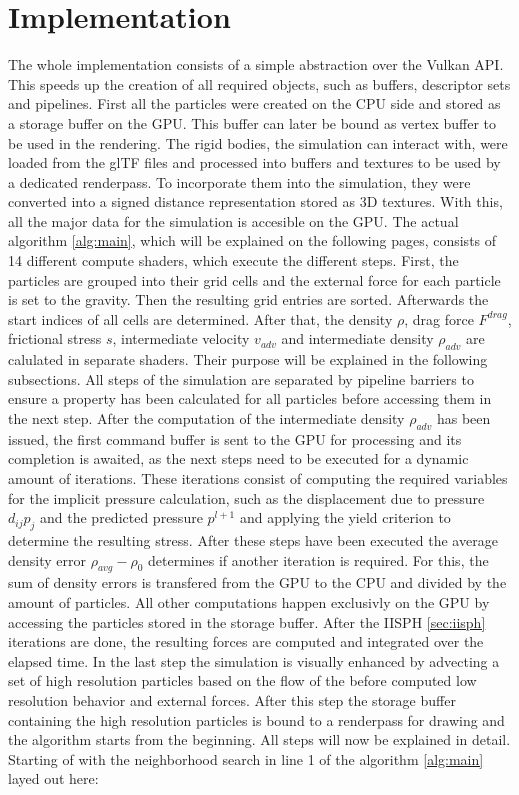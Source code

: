 \documentclass[intern]{cgMA}
\begin{document}
    \section{Implementation}\label{sec:impl}
    The whole implementation consists of a simple abstraction over the Vulkan API. This speeds up the creation of all required objects, such as buffers, descriptor sets and pipelines. First all the particles were created on the CPU side and stored as a storage buffer on the GPU. This buffer can later be bound as vertex buffer to be used in the rendering. The rigid bodies, the simulation can interact with, were loaded from the glTF files and processed into buffers and textures to be used by a dedicated renderpass. To incorporate them into the simulation, they were converted into a signed distance representation stored as 3D textures. With this, all the major data for the simulation is accesible on the GPU.
    The actual algorithm \ref*{alg:main}, which will be explained on the following pages, consists of 14 different compute shaders, which execute the different steps. First, the particles are grouped into their grid cells and the external force for each particle is set to the gravity. Then the resulting grid entries are sorted. Afterwards the start indices of all cells are determined. After that, the density $\rho$, drag force $F^{drag}$, frictional stress $s$, intermediate velocity $v_{adv}$ and intermediate density $\rho_{adv}$ are calulated in separate shaders. Their purpose will be explained in the following subsections. All steps of the simulation are separated by pipeline barriers to ensure a property has been calculated for all particles before accessing them in the next step. After the computation of the intermediate density $\rho_{adv}$ has been issued, the first command buffer is sent to the GPU for processing and its completion is awaited, as the next steps need to be executed for a dynamic amount of iterations. These iterations consist of computing the required variables for the implicit pressure calculation, such as the displacement due to pressure $d_{ij}p_{j}$ and the predicted pressure $p^{l+1}$ and applying the yield criterion to determine the resulting stress. After these steps have been executed the average density error $\rho_{avg} - \rho_0$ determines if another iteration is required. For this, the sum of density errors is transfered from the GPU to the CPU and divided by the amount of particles. All other computations happen exclusivly on the GPU by accessing the particles stored in the storage buffer. After the IISPH \ref{sec:iisph} iterations are done, the resulting forces are computed and integrated over the elapsed time. In the last step the simulation is visually enhanced by advecting a set of high resolution particles based on the flow of the before computed low resolution behavior and external forces. After this step the storage buffer containing the high resolution particles is bound to a renderpass for drawing and the algorithm starts from the beginning. All steps will now be explained in detail. Starting of with the neighborhood search in line 1 of the algorithm \ref{alg:main} layed out here:
\end{document}
